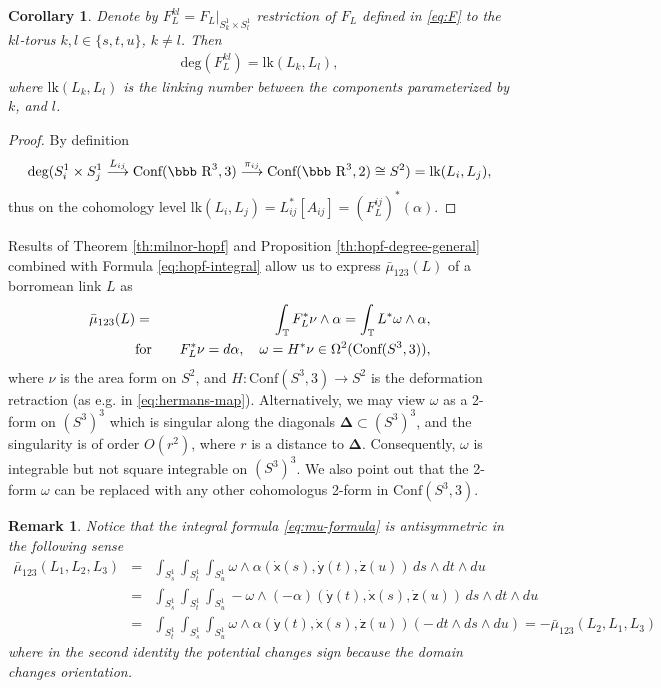 \documentclass[12pt]{article}
\newtheorem{corollary}[theorem]{Corollary}
\newtheorem{rem}[theorem]{Remark}
\newenvironment{remark}{\begin{rem} \rm}{\end{rem}}
\newcommand{\R}{\mbox{\bbb R}}       %
\newcommand{\Cnf}{\text{Conf}}
\newcommand{\no}{\noindent}
\begin{document}
\begin{corollary}\label{th:pairwise-linking}
Denote by $F^{kl}_L=F_L\bigl|_{S^1_k\times S^1_l}$ restriction of $F_L$ defined in \eqref{eq:F}
to the $kl$-torus $k,l\in\{s,t,u\}$, $k\neq l$. Then
\begin{gather}
 \text{deg}(F^{kl}_L)=\text{lk}(L_k,L_l),
\end{gather}
where $\text{lk}(L_k,L_l)$ is the linking number between the components
parameterized by $k$, and $l$.
\end{corollary}
\begin{proof}
 By definition 
 \[
  \text{deg}(S_i^1\times S_j^1\stackrel{L_{ij}}{\longrightarrow} \Cnf(\R^3,3)\stackrel{\pi_{ij}}{\longrightarrow} \Cnf(\R^3,2)\cong S^2)=\text{lk}(L_i,L_j),
  \] 
thus on the cohomology level $\text{lk}(L_i,L_j)=L^\ast_{ij}[A_{ij}]=(F^{ij}_L)^\ast(\alpha)$.
\end{proof}
 
\no Results of Theorem \ref{th:milnor-hopf} and Proposition \ref{th:hopf-degree-general} combined with Formula \eqref{eq:hopf-integral} allow us to express $\bar{\mu}_{123}(L)$ of a borromean link $L$ as
 \begin{eqnarray}\label{eq:mu-formula}
  \bar{\mu}_{123}(L) & = & \int_{\mathbb{T}} F^\ast_L\nu\wedge \alpha=\int_{\mathbb{T}} L^\ast\omega\wedge \alpha,\\
  \notag & \text{for} &  \quad F^\ast_L\nu=d\alpha,\quad \omega=H^\ast\nu\in \Omega^2(\Cnf(S^3,3)),
 \end{eqnarray}
 where $\nu$ is the area form on $S^2$, and $H:\Cnf(S^3,3)\longrightarrow S^2$ is the deformation retraction 
 (as e.g. in \eqref{eq:hermans-map}). Alternatively, we may view $\omega$ as a 2-form on $(S^3)^3$ which is singular along 
 the diagonals $\mathbf{\Delta}\subset (S^3)^3$, and the singularity is of order $O(r^2)$, where $r$ is a distance to $\mathbf{\Delta}$. Consequently, $\omega$ is integrable but not square integrable on $(S^3)^3$. 
 We also point out that the 2-form $\omega$ can be replaced with any other cohomologus 2-form in $\text{Conf}(S^3,3)$.
 
\begin{remark}\label{rem:anti-symmetry}
  Notice that the integral formula \eqref{eq:mu-formula} is antisymmetric in the following sense 
  \begin{eqnarray*}
   \bar{\mu}_{123}(L_1,L_2,L_3) & = & \int_{S^1_s}\int_{S^1_t}\int_{S^1_u} \omega\wedge\alpha(\dot{\mathsf{x}}(s),\dot{\mathsf{y}}(t),\dot{\mathsf{z}}(u))\,ds\wedge
   dt\wedge du\\
   & = & \int_{S^1_s}\int_{S^1_t}\int_{S^1_u} -\omega\wedge(-\alpha)(\dot{\mathsf{y}}(t),\dot{\mathsf{x}}(s),\dot{\mathsf{z}}(u))\,ds\wedge dt\wedge du\\
   & = & \int_{S^1_t}\int_{S^1_s}\int_{S^1_u} \omega\wedge\alpha(\dot{\mathsf{y}}(t),\dot{\mathsf{x}}(s),\dot{\mathsf{z}}(u))(-\,dt\wedge ds \wedge du)=-\bar{\mu}_{123}(L_2,L_1,L_3)
  \end{eqnarray*}
  where in the second identity the potential changes sign because the domain changes orientation.
\end{remark}
\end{document}
